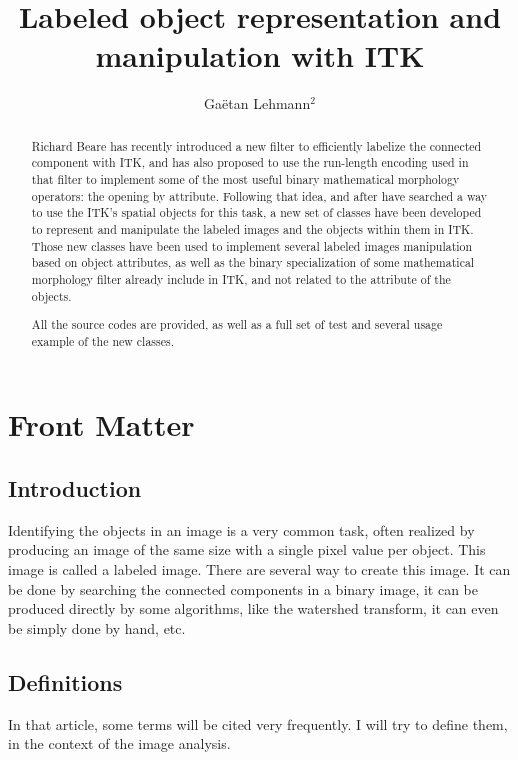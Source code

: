 \documentclass{InsightArticle}
\title{Labeled object representation and manipulation with ITK}
\author{Ga\"etan Lehmann{$^2$}}
\begin{document}
\maketitle

\ifhtml
\chapter*{Front Matter\label{front}}
\fi


\begin{abstract}
\noindent

Richard Beare has recently introduced a new filter to efficiently labelize the connected component with ITK, and has also proposed to use the run-length encoding used in that filter to implement some of the most useful binary mathematical morphology operators: the opening by attribute.
Following that idea, and after have searched a way to use the ITK's spatial objects for this task, a new set of classes have been developed to represent and manipulate the labeled images and the objects within them in ITK.
Those new classes have been used to implement several labeled images manipulation based on object attributes, as well as the binary specialization of some mathematical morphology filter already include in ITK, and not related to the attribute of the objects.

All the source codes are provided, as well as a full set of test and several usage example of the new classes.

\end{abstract}

\tableofcontents

\section{Introduction}

Identifying the objects in an image is a very common task, often realized by producing an image of the same size with a single pixel value per object. This image is called a labeled image. There are several way to create this image. It can be done by searching the connected components in a binary image, it can be produced directly by some algorithms, like the watershed transform, it can even be simply done by hand, etc.

\section{Definitions}

In that article, some terms will be cited very frequently. I will try to define them, in the context of the image analysis.
\end{document}
